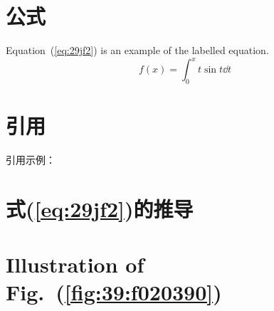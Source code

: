 \documentclass{article}
\begin{document}
\section{公式}
Equation~(\ref{eq:29jf2}) is an example of the labelled equation.
\begin{equation}
    f(x) = \int_0^x t\sin t \dd t
    \label{eq:29jf2}
\end{equation}

\section{引用}
引用示例：\cite{Zhong2020InsertionLossThin}



\begin{appendices}

    \section{式(\ref{eq:29jf2})的推导}
    \lipsum[1]

    \lipsum[1]

    \lipsum[1]

    \section{Illustration of Fig.~(\ref{fig:39:f020390})}
    \lipsum[1]

    \lipsum[1]
\end{appendices}





\end{document}
